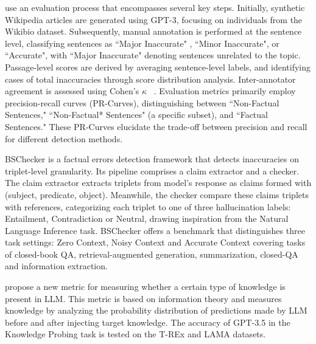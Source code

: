 \citet{SelfCheckGPT} use an evaluation process that encompasses several key steps. Initially, synthetic Wikipedia articles are generated using GPT-3, focusing on individuals from the Wikibio dataset. Subsequently, manual annotation is performed at the sentence level, classifying sentences as ``Major Inaccurate" , ``Minor Inaccurate", or ``Accurate", with ``Major Inaccurate" denoting sentences unrelated to the topic. Passage-level scores are derived by averaging sentence-level labels, and identifying cases of total inaccuracies through score distribution analysis. Inter-annotator agreement is assessed using Cohen's $\kappa$ ~\cite{cohen1960coefficient}. Evaluation metrics primarily employ precision-recall curves (PR-Curves), distinguishing between ``Non-Factual Sentences," ``Non-Factual* Sentences" (a specific subset), and ``Factual Sentences." These PR-Curves elucidate the trade-off between precision and recall for different detection methods.

BSChecker \citep{BSChecker} is a factual errors detection framework that detects inaccuracies on triplet-level granularity. Its pipeline comprises a claim extractor and a checker. The claim extractor extracts triplets from model’s response as claims formed with (subject, predicate, object). Meanwhile, the checker compare these claims triplets with references, categorizing each triplet to one of three hallucination labels: Entailment, Contradiction or Neutral, drawing inspiration from the Natural Language Inference task. BSChecker offers a benchmark that distinguishes three task settings: Zero Context, Noisy Context and Accurate Context covering tasks of closed-book QA, retrieval-augmented generation, summarization, closed-QA and information extraction.

\citet{pezeshkpour2023measuring} propose a new metric for measuring whether a certain type of knowledge is present in LLM. This metric is based on information theory and measures knowledge by analyzing the probability distribution of predictions made by LLM before and after injecting target knowledge. The accuracy of GPT-3.5 in the Knowledge Probing task is tested on the T-REx \citep{TREx} and LAMA \citep{LAMA} datasets. %


